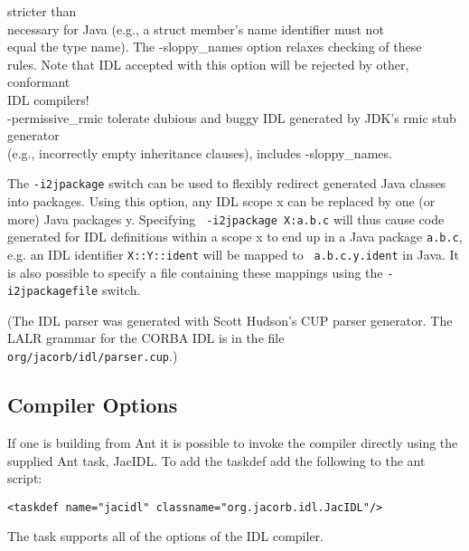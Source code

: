 \begin{tabbing}
stricter than\\
\> \> necessary for Java (e.g., a struct member's name identifier must
not \\
\> \> equal the type name). The -sloppy\_names option relaxes checking of
these \\
\> \>  rules. Note that IDL accepted with this option will be rejected
by other, conformant  \\
\> \> IDL compilers!\\
\> -permissive\_rmic  \>  tolerate dubious and buggy IDL generated by
JDK's rmic stub generator\\
\> \> (e.g., incorrectly empty inheritance clauses), includes -sloppy\_names.\\
\end{tabbing}

The {\tt -i2jpackage} switch can be used to flexibly redirect
generated Java classes into packages. Using this option, any IDL scope
x can be replaced by one (or more) Java packages y. Specifying {\tt
  -i2jpackage X:a.b.c} will thus cause code generated for IDL
definitions within a scope x to end up in a Java package {\tt a.b.c},
e.g. an IDL identifier {\tt X::Y::ident} will be mapped to {\tt
  a.b.c.y.ident} in Java. It is also possible to specify a file
containing these mappings using the {\tt -i2jpackagefile} switch.

(The  IDL  parser  was   generated  with  Scott  Hudson's  CUP  parser
generator.  The  LALR grammar for  the CORBA IDL  is in the  file {\tt
org/jacorb/idl/parser.cup}.)

\subsection*{Compiler Options}
If one is building from Ant it is possible to invoke the compiler directly
using the supplied Ant task, JacIDL. To add the taskdef add the following
to the ant script:
\small{
\begin{verbatim}
<taskdef name="jacidl" classname="org.jacorb.idl.JacIDL"/>
\end{verbatim}
}
The task supports all of the options of the IDL compiler.

